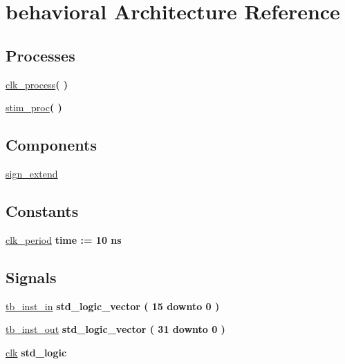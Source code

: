 \hypertarget{classsign__extend__tb_1_1behavioral}{\section{behavioral \-Architecture \-Reference}
\label{classsign__extend__tb_1_1behavioral}
}
\*
\*
\subsection*{\-Processes}
 \begin{DoxyCompactItemize}
\item 
\hyperlink{classsign__extend__tb_1_1behavioral_ac5bb218131b813f7908ec89476b31fca}{clk\-\_\-process}{\bfseries  (  )}
\item 
\hyperlink{classsign__extend__tb_1_1behavioral_ad2efa6785cff833c341e27596b21aeb5}{stim\-\_\-proc}{\bfseries  (  )}
\end{DoxyCompactItemize}
\subsection*{\-Components}
 \begin{DoxyCompactItemize}
\item 
\hyperlink{classsign__extend__tb_1_1behavioral_ae8c2ce7af13c1660d88b4bbb78fc2bf1}{sign\-\_\-extend}  {\bfseries }  
\end{DoxyCompactItemize}
\subsection*{\-Constants}
 \begin{DoxyCompactItemize}
\item 
\hyperlink{classsign__extend__tb_1_1behavioral_a508d91be85dbb14f5c19987e818c5aa9}{clk\-\_\-period} {\bfseries time  \-:=  10  ns } 
\end{DoxyCompactItemize}
\subsection*{\-Signals}
 \begin{DoxyCompactItemize}
\item 
\hyperlink{classsign__extend__tb_1_1behavioral_a195679646fa56787dd40a959d5db389b}{tb\-\_\-inst\-\_\-in} {\bfseries std\-\_\-logic\-\_\-vector (   15    downto    0  ) } 
\item 
\hyperlink{classsign__extend__tb_1_1behavioral_a71f8643ece1a5e3b2f2ba929e151a00d}{tb\-\_\-inst\-\_\-out} {\bfseries std\-\_\-logic\-\_\-vector (   31    downto    0  ) } 
\item 
\hyperlink{classsign__extend__tb_1_1behavioral_af5c312450d9816b418bbe2f10c031a4b}{clk} {\bfseries std\-\_\-logic } 
\end{DoxyCompactItemize}


